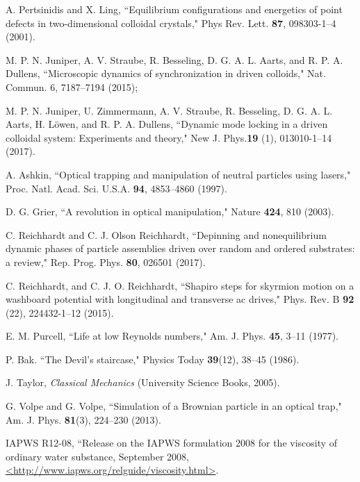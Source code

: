 \documentclass[preprint,showpacs,preprintnumbers,amsmath,amssymb,aps,prb]{revtex4-1}
\theoremstyle{remark}
\begin{document}
\begin{thebibliography}{99}
    
   A. Pertsinidis and X. Ling,  ``Equilibrium configurations and energetics of point defects in two-dimensional colloidal crystals," Phys Rev. Lett.  {\bf 87}, 098303-1--4 (2001). %

   M. P. N. Juniper, A. V. Straube, R. Besseling, D. G. A. L. Aarts, and R. P. A. Dullens, ``Microscopic dynamics of synchronization in driven colloids," Nat. Commun. 6, 7187--7194 (2015); 
      
   M. P. N. Juniper,  U. Zimmermann, A. V. Straube, R. Besseling, D. G. A. L. Aarts, H. L{\"o}wen, and R. P. A. Dullens,  ``Dynamic mode locking in a driven colloidal system: Experiments and theory," New J. Phys.{\bf 19} (1), 013010-1--14 (2017).  %

   A. Ashkin, ``Optical trapping and manipulation of neutral particles using lasers," Proc. Natl. Acad. Sci. U.S.A. {\bf 94}, 4853--4860 (1997).

   D. G. Grier, ``A revolution in optical manipulation," Nature {\bf 424}, 810 (2003).

   C. Reichhardt and C. J. Olson Reichhardt, ``Depinning and nonequilibrium dynamic phases of particle assemblies driven over random and ordered substrates: a review," Rep. Prog. Phys. {\bf 80}, 026501 (2017).

   C. Reichhardt, and C. J. O. Reichhardt,  ``Shapiro steps for skyrmion motion on a washboard potential with longitudinal and transverse ac drives," Phys. Rev. B {\bf 92} (22), 224432-1--12 (2015).      

   E. M. Purcell, ``Life at low Reynolds numbers,"  Am. J. Phys. {\bf 45}, 3--11 (1977).
  
   P. Bak. ``The Devil's staircase," Physics Today {\bf 39}(12), 38--45 (1986).

   J. Taylor,  {\it Classical Mechanics} (University Science Books, 2005).

   G. Volpe and G. Volpe, ``Simulation of a Brownian particle in an optical trap,"  Am. J. Phys. {\bf 81}(3), 224--230 (2013).

    IAPWS R12-08, 
    ``Release on the IAPWS formulation 2008 for the viscosity of ordinary water substance,  September 2008,
    \url{<http://www.iapws.org/relguide/viscosity.html>}.


\end{thebibliography}
\end{document}
